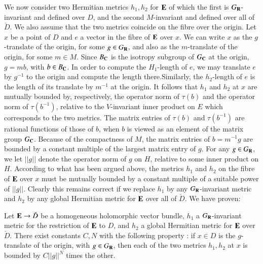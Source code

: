 We now consider two Hermitian metrics $h_1, h_2$ for $\mathbf{E}$ of which the first is $G_{\mathbf{R}}$-invariant and defined over $D$, and the second $M$-invariant and defined over  all of $\check{D}$. We also assume that the two metrics coincide on the fibre over the origin. Let $x$ be a point of $D$ and $e$ a vector in the fibre of $\mathbf{E}$ over $x$. We can write $x$ as the $g$-translate of the origin, for some $g \in G_{\mathbf{R}}$, and also as the $m$-translate of the origin, for some $m \in M$. Since $B_{\mathbf{C}}$ is the isotropy subgroup of $G_{\mathbf{C}}$ at the origin, $g = mb$, with $b \in B_{\mathbf{C}}$. In order to compute the $H_1$-length of $e$, we may translate $e$ by $g^{-1}$ to the origin and compute the length there.\pageoriginale Similarly, the $h_2$-length of $e$ is the length of its translate by $m^{-1}$ at the origin. It follows that $h_1$ and $h_2$ at $x$ are mutually bounded by, respectively, the operator norm of $\tau(b)$ and the operator norm of $\tau (b^{-1})$, relative to the $V$-invariant inner product on $E$ which corresponds to the two metrics. The matrix entries of $\tau (b)$ and $\tau (b^{-1})$ are rational functions of those of $b$, when $b$ is viewed as an element of the matrix group $G_{\mathbf{C}}$. Because of the compactness of $M$, the matrix entries of $b = m^{-1} g$ are bounded by a constant multiple of the largest matrix entry of $g$. For any $g \in G_{\mathbf{R}}$, we let $||g||$ denote the operator norm of $g$ on $H$, relative to some inner product on $H$. According to what has been argued above, the metrics $h_1$ and $h_2$ on the fibre of $\mathbf{E}$ over $x$ must be mutually bounded by a constant multiple of a suitable power of $||g||$. Clearly this remains correct if we replace $h_1$ by any $G_{\mathbf{R}}$-invariant metric and $h_2$ by any global Hermitian metric for $\mathbf{E}$ over all of $\check{D}$. We have proven:

\setcounter{lemma}{18}
\begin{lemma}\label{art4-lem3.19}
Let $\mathbf{E} \to \check{D}$ be a homogeneous holomorphic vector bundle, $h_1$ a $G_{\mathbf{R}}$-invariant metric for the restriction of $\mathbf{E}$ to $D$, and $h_2$ a global Hermitian metric for $\mathbf{E}$ over $\check{D}$. There exist constants $C, N$ with the following property : if $x \in D$ is the $g$-translate of the origin, with $g \in G_{\mathbf{R}}$, then each of the two metrics $h_1, h_2$ at $x$ is bounded by $C ||g||^N$ times the other.
\end{lemma}


